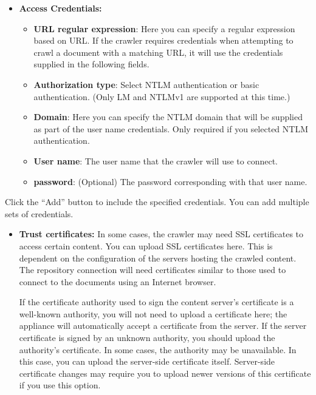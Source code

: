 \begin{itemize}

\item \textbf{Access Credentials:} 

\begin{itemize}

\item \textbf{URL regular expression}:
Here you can specify a regular expression based on URL. If the crawler
requires credentials when attempting to crawl a document with a
matching URL, it will use the credentials supplied in the following
fields.

\item \textbf{Authorization type}: Select NTLM authentication or basic authentication. (Only LM and NTLMv1 are supported at this time.)

\item \textbf{Domain}: Here you can specify the NTLM domain that will be supplied as part of the user name credentials. Only required if you selected NTLM authentication.

\item \textbf{User name}: The user name that the crawler will use to connect.

\item \textbf{password}: (Optional) The password corresponding with that user name.

\end{itemize}

\end{itemize}

Click the ``Add'' button to include the specified credentials. You can
add multiple sets of credentials.



\begin{itemize}

\item \textbf{Trust certificates:}
In some cases, the crawler may need SSL certificates to access certain
content. You can upload SSL certificates here. This is dependent on
the configuration of the servers hosting the crawled content.  The
repository connection will need certificates similar to those used to
connect to the documents using an Internet browser.


If the certificate authority used to sign the content server's
certificate is a well-known authority, you will not need to upload a
certificate here; the appliance will automatically accept a
certificate from the server. If the server certificate is signed by an
unknown authority, you should upload the authority's certificate. In
some cases, the authority may be unavailable. In this case, you can
upload the server-side certificate itself. Server-side certificate
changes may require you to upload newer versions of this certificate
if you use this option.



\end{itemize}

